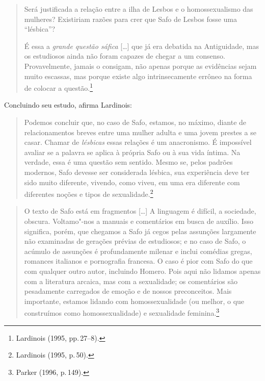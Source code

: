 \begin{quote}
Será justificada a relação entre a ilha de Lesbos e o homossexualismo das
mulheres? Existiriam razões para crer que Safo de Lesbos fosse uma ``lésbica''?

É essa a \emph{grande questão sáfica} {[}\ldots{}{]} que já era debatida na Antiguidade, mas
os estudiosos ainda não foram capazes de chegar a um consenso. Provavelmente,
jamais o consigam, não apenas porque as evidências sejam muito escassas, mas
porque existe algo intrinsecamente errôneo na forma de colocar a questão.\footnote{ Lardinois (1995, pp.\,27--8).}
\end{quote}

Concluindo seu estudo, afirma Lardinois:

\begin{quote}
Podemos concluir que, no caso de Safo, estamos, no máximo, diante de
relacionamentos breves entre uma mulher adulta e uma jovem prestes a se casar.
Chamar de \emph{lésbicas} essas relações é um anacronismo. É impossível avaliar se a
palavra se aplica à própria Safo ou à sua vida íntima. Na verdade, essa é uma
questão sem sentido. Mesmo se, pelos padrões modernos, Safo devesse ser
considerada lésbica, sua experiência deve ter sido muito diferente, vivendo,
como viveu, em uma era diferente com diferentes noções e tipos de sexualidade.\footnote{ Lardinois (1995, p.\,50).}
\end{quote}


\begin{quote}
O texto de Safo está em fragmentos {[}\ldots{}{]} A linguagem é difícil, a sociedade,
obscura. Voltamo"-nos a manuais e comentários em busca de auxílio. Isso
significa, porém, que chegamos a Safo já cegos pelas assunções largamente não
examinadas de gerações prévias de estudiosos; e no caso de Safo, o acúmulo de
assunções é profundamente milenar e inclui comédias gregas, romances italianos
e pornografia francesa. O caso é pior com Safo do que com qualquer outro autor,
incluindo Homero. Pois aqui não lidamos apenas com a literatura arcaica, mas
com a sexualidade; os comentários são pesadamente carregados de emoção e de
nossos preconceitos. Mais importante, estamos lidando com homossexualidade (ou
melhor, o que construímos como homossexualidade) e sexualidade feminina.\footnote{ Parker (1996, p.\,149).}
\end{quote}

